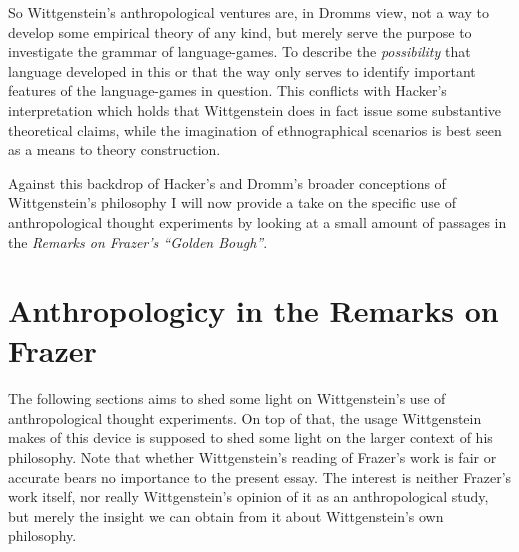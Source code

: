 \documentclass{article}
\begin{document}
So Wittgenstein's anthropological ventures are, in Dromms view, not a way to develop some empirical theory of any kind, but merely serve the purpose to investigate the grammar of language-games. To describe the \textit{possibility} that language developed in this or that the way only serves to identify important features of the language-games in question. This conflicts with Hacker's interpretation which holds that Wittgenstein does in fact issue some substantive theoretical claims, while the imagination of ethnographical scenarios is best seen as a means to theory construction.

Against this backdrop of Hacker's and Dromm's broader conceptions of Wittgenstein's philosophy I will now provide a take on the specific use of anthropological thought experiments by looking at a small amount of passages in the \textit{Remarks on Frazer's ``Golden Bough''}.

\section{Anthropologicy in the Remarks on Frazer}
\paragraph{ }
The following sections aims to shed some light on Wittgenstein's use of anthropological thought experiments. On top of that, the usage Wittgenstein makes of this device is supposed to shed some light on the larger context of his philosophy. Note that whether Wittgenstein's reading of Frazer's work is fair or accurate bears no importance to the present essay. The interest is neither Frazer's work itself, nor really Wittgenstein's opinion of it as an anthropological study, but merely the insight we can obtain from it about Wittgenstein's own philosophy. 
\end{document}
